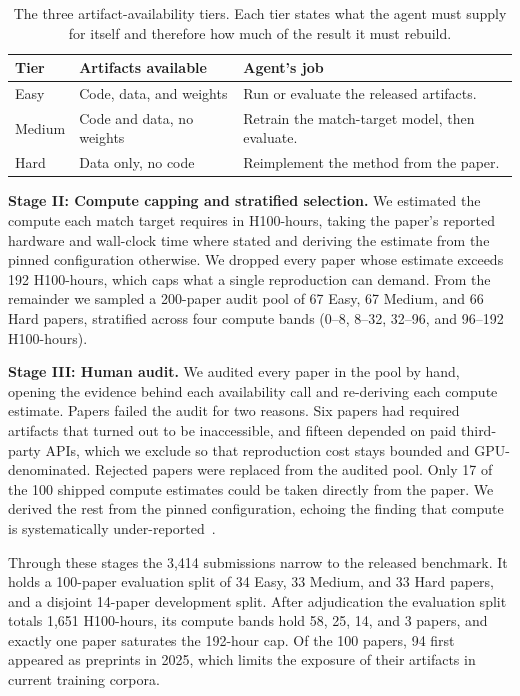 \begin{table}[t]
\caption{The three artifact-availability tiers. Each tier states what the
agent must supply for itself and therefore how much of the result it must
rebuild.}
\label{tab:tiers}
\begin{center}
\begin{tabular}{@{}lll@{}}
\toprule
Tier & Artifacts available & Agent's job \\
\midrule
Easy & Code, data, and weights & Run or evaluate the released artifacts. \\
Medium & Code and data, no weights & Retrain the match-target model, then evaluate. \\
Hard & Data only, no code & Reimplement the method from the paper. \\
\bottomrule
\end{tabular}
\end{center}
\end{table}

\textbf{Stage II: Compute capping and stratified selection.} We estimated the
compute each match target requires in H100-hours, taking the paper's reported
hardware and wall-clock time where stated and deriving the estimate from the
pinned configuration otherwise. We dropped every paper whose estimate exceeds
192 H100-hours, which caps what a single reproduction can demand. From the
remainder we sampled a 200-paper audit pool of 67 Easy, 67 Medium, and 66
Hard papers, stratified across four compute bands (0--8, 8--32, 32--96, and
96--192 H100-hours).

\textbf{Stage III: Human audit.} We audited every paper in the pool by hand,
opening the evidence behind each availability call and re-deriving each
compute estimate. Papers failed the audit for two reasons. Six papers had
required artifacts that turned out to be inaccessible, and fifteen depended
on paid third-party APIs, which we exclude so that reproduction cost stays
bounded and GPU-denominated. Rejected papers were replaced from the audited
pool. Only 17 of the 100 shipped compute estimates could be taken directly
from the paper. We derived the rest from the pinned configuration, echoing
the finding that compute is systematically
under-reported~\citep{gundersen2018state}.

Through these stages the 3,414 submissions narrow to the released benchmark.
It holds a 100-paper evaluation split of 34 Easy, 33 Medium, and 33 Hard
papers, and a disjoint 14-paper development split. After adjudication the
evaluation split totals 1,651 H100-hours, its compute bands hold 58, 25, 14,
and 3 papers, and exactly one paper saturates the 192-hour cap. Of the 100 papers, 94
first appeared as preprints in 2025, which limits the exposure of their
artifacts in current training corpora.
